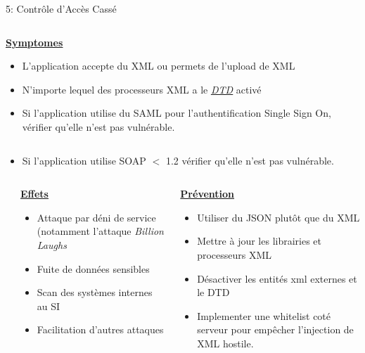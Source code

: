 \documentclass[final,hyperref={pdfpagelabels=false}]{beamer}
\begin{document}
\begin{frame}[t]
\begin{columns}[t]
\begin{column}{.465\textwidth}
\begin{block}{5: Contrôle d'Accès Cassé}
\begin{columns}[T]
		\begin{column}{.88\textwidth}
			\uline{\uline{\textbf{Symptomes}}}
			\begin{itemize}
				\item L'application accepte du XML ou permets de l'upload de XML
                \item N'importe lequel des processeurs XML a le
                    \href{https://www.w3schools.com/xml/xml_dtd_intro.asp}{\uline{\textit{DTD}}}
                    activé
				\item Si l'application utilise du SAML pour l'authentification
                    Single Sign On, vérifier qu'elle n'est pas vulnérable.
			\end{itemize}
		\end{column}
	\end{columns}
    \begin{itemize}
        \item Si l'application utilise SOAP $<$ 1.2 vérifier qu'elle n'est
            pas vulnérable.
    \end{itemize}
	\begin{columns}[T]
		\begin{column}{.01\textwidth}
		\end{column}
		\begin{column}{0.495\textwidth}
			\vfill
			\uline{\textbf{Effets}}
			\begin{itemize}
                \item Attaque par déni de service (notamment l'attaque \textit{Billion
                    Laughs}
				\item Fuite de données sensibles
                \item Scan des systèmes internes au SI
                \item Facilitation d'autres attaques
			\end{itemize}
			\vfill
		\end{column}
		\begin{column}{0.495\textwidth}
			\vfill
			\uline{\textbf{Prévention}}
			\begin{itemize}
				\item Utiliser du JSON plutôt que du XML
                \item Mettre à jour les librairies et processeurs XML
                \item Désactiver les entités xml externes et le DTD
                \item Implementer une whitelist coté serveur pour empêcher
                    l'injection de XML hostile.
			\end{itemize}
		\end{column}
	\end{columns}
\end{block}


\end{column}
\end{columns}
\end{frame}
\end{document}
